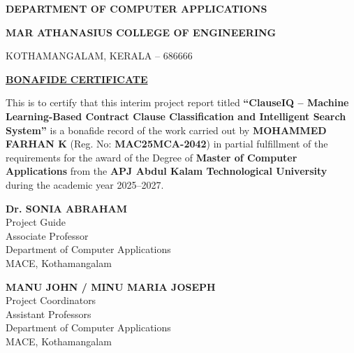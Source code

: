 \documentclass[12pt, a4paper]{report}
\begin{document}
\newpage
\thispagestyle{empty}
\begin{center}
    {\bfseries\fontsize{14}{17}\selectfont DEPARTMENT OF COMPUTER APPLICATIONS\par}
    {\bfseries\fontsize{13}{16}\selectfont MAR ATHANASIUS COLLEGE OF ENGINEERING\par}
    {\fontsize{11}{14}\selectfont KOTHAMANGALAM, KERALA -- 686666\par}
    
    \vspace{0.3in}
    
    {\bfseries\fontsize{16}{19}\selectfont\underline{BONAFIDE CERTIFICATE}\par}
\end{center}

\vspace{0.25in}

{\justifying\fontsize{12}{17}\selectfont
This is to certify that this interim project report titled \textbf{``ClauseIQ -- Machine Learning-Based Contract Clause Classification and Intelligent Search System''} is a bonafide record of the work carried out by \textbf{MOHAMMED FARHAN K} (Reg. No: \textbf{MAC25MCA-2042}) in partial fulfillment of the requirements for the award of the Degree of \textbf{Master of Computer Applications} from the \textbf{APJ Abdul Kalam Technological University} during the academic year 2025--2027.\par}

\vspace{0.6in}

\noindent
\begin{minipage}[t]{0.45\textwidth}
    \centering
    \textbf{Dr. SONIA ABRAHAM}\\
    Project Guide\\
    Associate Professor\\
    Department of Computer Applications\\
    MACE, Kothamangalam
\end{minipage}
\hfill
\begin{minipage}[t]{0.45\textwidth}
    \centering
    \textbf{MANU JOHN / MINU MARIA JOSEPH}\\
    Project Coordinators\\
    Assistant Professors\\
    Department of Computer Applications\\
    MACE, Kothamangalam
\end{minipage}
\end{document}
